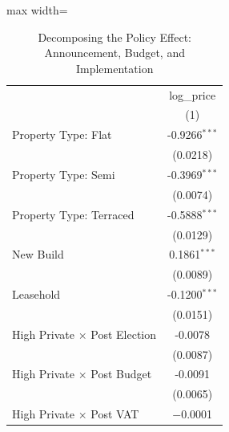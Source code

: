 
\begin{table}[htbp]
   \caption{\label{tab:announce} Decomposing the Policy Effect: Announcement, Budget, and Implementation}
   \bigskip
   \centering
   \begin{adjustbox}{max width=\textwidth}
   \begin{tabular}{lc}
      \toprule
                                                                              & log\_price\\   
                                                                              & (1)\\  
      \midrule 
      Property Type: Flat                                                     & -0.9266$^{***}$\\
                                                                              & (0.0218)\\
      Property Type: Semi                                                     & -0.3969$^{***}$\\
                                                                              & (0.0074)\\
      Property Type: Terraced                                                 & -0.5888$^{***}$\\
                                                                              & (0.0129)\\
      New Build                                                               & 0.1861$^{***}$\\
                                                                              & (0.0089)\\
      Leasehold                                                               & -0.1200$^{***}$\\
                                                                              & (0.0151)\\   
      High Private $\times$ Post Election                                    & -0.0078\\
                                                                              & (0.0087)\\
      High Private $\times$ Post Budget                                       & -0.0091\\
                                                                              & (0.0065)\\
      High Private $\times$ Post VAT                                          & $-$0.0001\\

\end{tabular}
\end{adjustbox}
\end{table}
